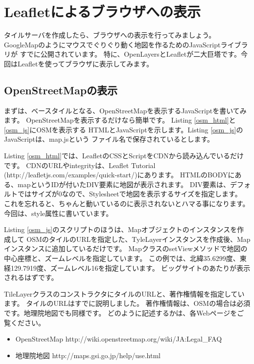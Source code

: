 \chapter*{Leafletによるブラウザへの表示}

タイルサーバを作成したら、ブラウザへの表示を行ってみましょう。
GoogleMapのようにマウスでぐりぐり動く地図を作るためのJavaScriptライブラリが
すでに公開されています。
特に、OpenLayersとLeafletが二大巨塔です。今回はLeafletを使ってブラウザに表示してみます。

\section*{OpenStreetMapの表示}

まずは、ベースタイルとなる、OpenStreetMapを表示するJavaScriptを書いてみます。
OpenStreetMapを表示するだけなら簡単です。
Listing \ref{osm_html}と\ref{osm_js}にOSMを表示する
HTMLとJavaScriptを示します。Listing \ref{osm_js}のJavaScriptは、map.jsという
ファイル名で保存されているとします。

Listing \ref{osm_html}では、LeafletのCSSとScriptをCDNから読み込んでいるだけです。
CDNのURLやintegrityは、Leaflet Tutorial (http://leafletjs.com/examples/quick-start/)にあります。
HTMLのBODYにある、mapというIDが付いたDIV要素に地図が表示されます。
DIV要素は、デフォルトではサイズが0なので、Stylesheetで地図を表示するサイズを指定します。
これを忘れると、ちゃんと動いているのに表示されないとハマる事になります。
今回は、style属性に書いています。



Listing \ref{osm_js}のスクリプトのほうは、Mapオブジェクトのインスタンスを作成して
OSMのタイルのURLを指定した、TyleLayerインスタンスを作成後、Mapインスタンスに追加しているだけです。
MapクラスのsetViewメソッドで地図の中心座標と、ズームレベルを指定しています。
この例では、北緯35.6299度、東経129.7919度、ズームレベル16を指定しています。
ビッグサイトのあたりが表示されるはずです。



TileLayerクラスのコンストラクタにタイルのURLと、著作権情報を指定しています。
タイルのURLはすでに説明しました。
著作権情報は、OSMの場合は必須です。地理院地図でも同様です。
どのように記述するかは、各Webページをご覧ください。
\begin{itemize}
\item OpenStreetMap http://wiki.openstreetmap.org/wiki/JA:Legal\_FAQ
  \item 地理院地図 http://maps.gsi.go.jp/help/use.html
\end{itemize}

